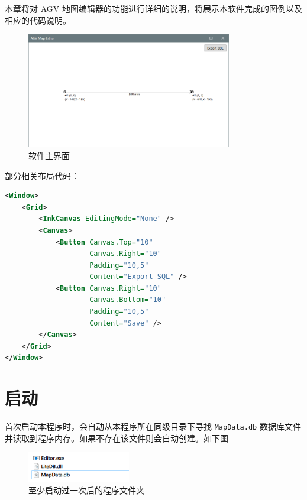 
本章将对 AGV 地图编辑器的功能进行详细的说明，将展示本软件完成的图例以及相应的代码说明。

\begin{figure}[H]
  \centering
  \includegraphics[width=0.8\textwidth]{assets/mainview.png}
  \caption{软件主界面}
  \label{fig:mainview}
\end{figure}

部分相关布局代码：

\begin{lstlisting}[language=XML]
<Window>
    <Grid>
        <InkCanvas EditingMode="None" />
        <Canvas>
            <Button Canvas.Top="10"
                    Canvas.Right="10"
                    Padding="10,5"
                    Content="Export SQL" />
            <Button Canvas.Right="10"
                    Canvas.Bottom="10"
                    Padding="10,5"
                    Content="Save" />
        </Canvas>
    </Grid>
</Window>
\end{lstlisting}

\section{启动}

首次启动本程序时，会自动从本程序所在同级目录下寻找 \texttt{MapData.db} 数据库文件并读取到程序内存。如果不存在该文件则会自动创建。如下图

\begin{figure}[H]
  \centering
  \includegraphics[width=0.4\textwidth]{assets/explorer.png}
  \caption{至少启动过一次后的程序文件夹}
  \label{fig:explorer}
\end{figure}

